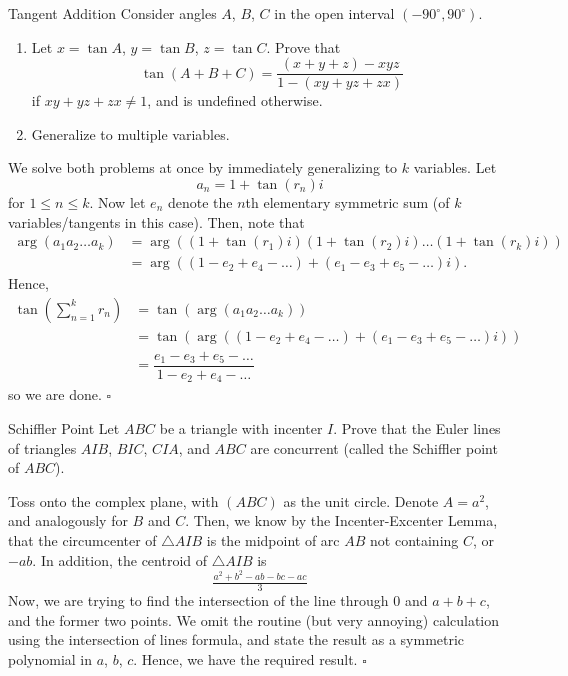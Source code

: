 \documentclass{article}
\begin{document}
\begin{problem}[6.39]{Tangent Addition}
Consider angles $A$, $B$, $C$ in the open interval $(-90^\circ, 90^\circ)$.
\begin{enumerate}[label=(\alph*)]
\item Let $x = \tan A$, $y = \tan B$, $z = \tan C$. Prove that \[\tan(A + B + C) = \dfrac{(x + y + z) - xyz}{1 - (xy + yz + zx)}\] if $xy + yz + zx \neq 1$, and is undefined otherwise.
\item Generalize to multiple variables.
\end{enumerate}
\end{problem}

We solve both problems at once by immediately generalizing to $k$ variables. Let \[a_n = 1+\tan(r_n)i\] for $1 \le n \le k$. Now let $e_n$ denote the $n$th elementary symmetric sum (of $k$ variables/tangents in this case). Then, note that 
\begin{align*}
\arg(a_1a_2\dots a_k) &= \arg((1+\tan(r_1)i)(1+\tan(r_2)i)\dots(1+\tan(r_k)i)) \\
&= \arg((1-e_2+e_4-\dots)+(e_1-e_3+e_5-\dots)i).
\end{align*}
Hence, 
\begin{align*}
\tan\left(\textstyle\sum_{n=1}^k r_n\right) &= \tan\left(\arg(a_1a_2\dots a_k)\right) \\
&= \tan(\arg((1-e_2+e_4-\dots)+(e_1-e_3+e_5-\dots)i)) \\
&= \dfrac{e_1-e_3+e_5-\dots}{1-e_2+e_4-\dots}
\end{align*}
so we are done. $\square$

\begin{problem}[6.40]{Schiffler Point}
Let $ABC$ be a triangle with incenter $I$. Prove that the Euler lines of triangles $AIB$, $BIC$, $CIA$, and $ABC$ are concurrent (called the Schiffler point of $ABC$).
\end{problem}

Toss onto the complex plane, with $(ABC)$ as the unit circle. Denote $A = a^2$, and analogously for $B$ and $C$. Then, we know by the Incenter-Excenter Lemma, that the circumcenter of $\triangle AIB$ is the midpoint of arc $AB$ not containing $C$, or $-ab$. In addition, the centroid of $\triangle AIB$ is \[\tfrac{a^2+b^2-ab-bc-ac}{3}\] Now, we are trying to find the intersection of the line through $0$ and $a+b+c$, and the former two points. We omit the routine (but very annoying) calculation using the intersection of lines formula, and state the result as a symmetric polynomial in $a$, $b$, $c$. Hence, we have the required result. $\square$
\end{document}
